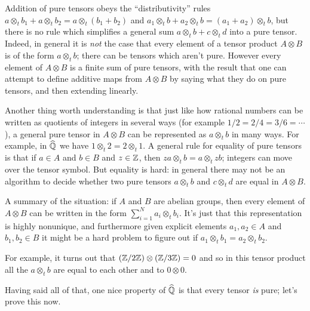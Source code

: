 Addition of pure tensors obeys the ``distributivity'' rules
$a\otimes_t b_1+a\otimes_t b_2=a\otimes_t(b_1+b_2)$ and
$a_1\otimes_t b+a_2\otimes_t b=(a_1+a_2)\otimes_t b$, but there is no rule which simplifies
a general sum $a\otimes_t b + c\otimes_t d$ into a pure tensor. Indeed, in general it is \emph{not}
the case that every element of a tensor product $A\otimes B$ is of the form $a\otimes_t b$; there can be
tensors which aren't pure. However every element of $A\otimes B$ is a finite sum of pure tensors,
with the result that one can attempt to define additive maps from $A\otimes B$ by saying what they
do on pure tensors, and then extending linearly.

Another thing worth understanding is that just like how rational numbers can be written as
quotients of integers in several ways (for example $1/2=2/4=3/6=\cdots$), a general pure tensor
in $A\otimes B$ can be represented as $a\otimes_t b$ in many ways. For example, in $\widehat{\mathbb{Q}}$
we have $1\otimes_t 2=2\otimes_t 1$. A general rule for equality of pure tensors is that if
$a\in A$ and $b\in B$ and $z\in\mathbb{Z}$, then $za\otimes_tb=a\otimes_tzb$; integers can move over the
tensor symbol. But equality is hard: in general there may not be an algorithm to decide
whether two pure tensors $a\otimes_t b$ and $c\otimes_t d$ are equal in $A\otimes B$.

\begin{remark} A summary of the situation: if $A$ and $B$ are abelian groups, then every element
    of $A\otimes B$ can be written in the form $\sum_{i=1}^Na_i\otimes_tb_i$. It's just that this
    representation is highly nonunique, and furthermore given explicit elements $a_1,a_2\in A$
    and $b_1,b_2\in B$ it might be a hard problem to figure out if
    $a_1\otimes_t b_1=a_2\otimes_t b_2$.

    For example, it turns out that $(\mathbb{Z}/2\mathbb{Z})\otimes(\mathbb{Z}/3\mathbb{Z})=0$
    and so in this tensor product all the $a\otimes_t b$ are equal to each other and to $0\otimes 0$.
\end{remark}

Having said all of that, one nice property of $\widehat{\mathbb{Q}}$ is that every tensor \emph{is} pure;
let's prove this now.

